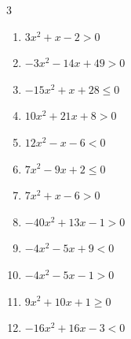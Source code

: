 \begin{multicols}{3}
\begin{enumerate}

  \item $3x^{2}+x-2>0$


  \item $-3x^{2}-14x+49>0$


  \item $-15x^{2}+x+28\leq 0$


  \item $10x^{2}+21x+8>0$


  \item $12x^{2}-x-6<0$


  \item $7x^{2}-9x+2\leq 0$


\columnbreak %

  \item $7x^{2}+x-6>0$


  \item $-40x^{2}+13x-1>0$


  \item $-4x^{2}-5x+9<0$


  \item $-4x^{2}-5x-1>0$


  \item $9x^{2}+10x+1\geq 0$


  \item $-16x^{2}+16x-3<0$


\end{enumerate}
\end{multicols}
